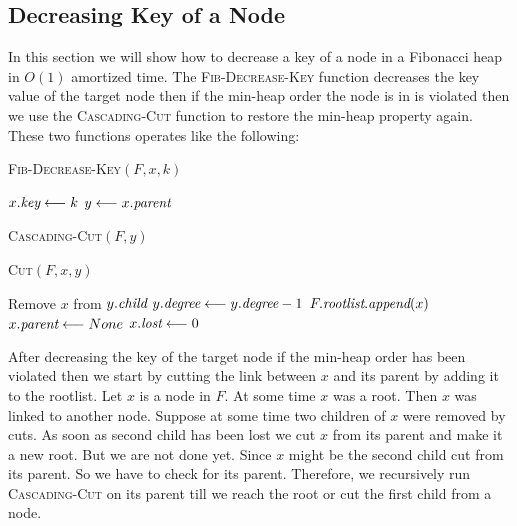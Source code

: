 \subsection{Decreasing Key of a Node}
In this section we will show how to decrease a key of a node in a Fibonacci heap in $O(1)$ amortized time. The \textsc{Fib-Decrease-Key} function decreases the key value of the target node then if the min-heap order the node is in is violated then we use the \textsc{Cascading-Cut} function to restore the min-heap property again. These two functions operates like the following:
\begin{center}
	\begin{minipage}{0.45\textwidth}
		\begin{algorithm}[H]
			\caption{\textsc{Fib-Decrease-Key}$(F,x,k)$}
			\DontPrintSemicolon
			$x.\emph{key}\longleftarrow k$\;
			$y\longleftarrow x.\emph{parent}$\;
		\end{algorithm}
	\end{minipage}\hfill
	\begin{minipage}{0.45\textwidth}
		\begin{algorithm}[H]
			\caption{\textsc{Cascading-Cut}$(F,y)$}
			\DontPrintSemicolon
		\end{algorithm}
		\begin{algorithm}[H]
			\caption{\textsc{Cut}$(F,x,y)$}
			\DontPrintSemicolon
			Remove $x$ from $y.\emph{child}$\;
			$y.\emph{degree}\longleftarrow y.\emph{degree}-1$\;
			$F.\emph{rootlist}.\emph{append}(x)$\;
			$x.\emph{parent}\longleftarrow None$\;
			$x.\emph{lost}\longleftarrow 0$\;
		\end{algorithm}
	\end{minipage}
\end{center}
After decreasing the key of the target node if the min-heap order has been violated then we start by cutting the link between $x$ and its parent by adding it to the rootlist. Let $x$ is a node in $F$. At some time $x$ was a root. Then $x$ was linked to another node. Suppose at some time two children of $x$ were removed by cuts. As soon as second child has been lost we cut $x$ from its parent and make it a new root. But we are not done yet. Since $x$ might be the second child cut from its parent. So we have to check for its parent. Therefore, we recursively run \textsc{Cascading-Cut} on its parent till we reach the root or cut the first child from a node. 

